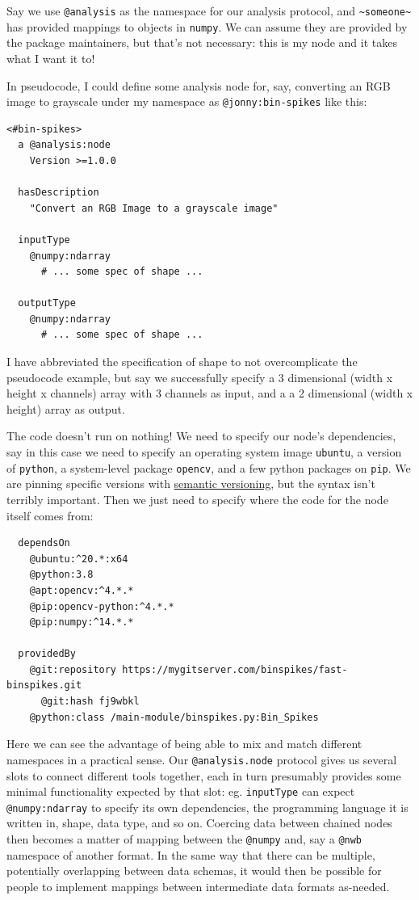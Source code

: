 \documentclass[10pt]{article}
\begin{document}
\begin{multicols}{2}
Say we use \texttt{@analysis} as the namespace for our analysis
protocol, and \texttt{\textasciitilde{}someone\textasciitilde{}} has
provided mappings to objects in \texttt{numpy}. We can assume they are
provided by the package maintainers, but that's not necessary: this is
my node and it takes what I want it to!

In pseudocode, I could define some analysis node for, say, converting an
RGB image to grayscale under my namespace as \texttt{@jonny:bin-spikes}
like this:

\begin{verbatim}
<#bin-spikes>
  a @analysis:node
    Version >=1.0.0

  hasDescription
    "Convert an RGB Image to a grayscale image"

  inputType
    @numpy:ndarray
      # ... some spec of shape ...

  outputType
    @numpy:ndarray
      # ... some spec of shape ...
\end{verbatim}

I have abbreviated the specification of shape to not overcomplicate the
pseudocode example, but say we successfully specify a 3 dimensional
(width x height x channels) array with 3 channels as input, and a a 2
dimensional (width x height) array as output.

The code doesn't run on nothing! We need to specify our node's
dependencies, say in this case we need to specify an operating system
image \texttt{ubuntu}, a version of \texttt{python}, a system-level
package \texttt{opencv}, and a few python packages on \texttt{pip}. We
are pinning specific versions with \href{https://semver.org/}{semantic
versioning}, but the syntax isn't terribly important. Then we just need
to specify where the code for the node itself comes from:

\begin{verbatim}
  dependsOn
    @ubuntu:^20.*:x64
    @python:3.8
    @apt:opencv:^4.*.*
    @pip:opencv-python:^4.*.*
    @pip:numpy:^14.*.*

  providedBy
    @git:repository https://mygitserver.com/binspikes/fast-binspikes.git
      @git:hash fj9wbkl
    @python:class /main-module/binspikes.py:Bin_Spikes
\end{verbatim}

Here we can see the advantage of being able to mix and match different
namespaces in a practical sense. Our \texttt{@analysis.node} protocol
gives us several slots to connect different tools together, each in turn
presumably provides some minimal functionality expected by that slot:
eg. \texttt{inputType} can expect \texttt{@numpy:ndarray} to specify its
own dependencies, the programming language it is written in, shape, data
type, and so on. Coercing data between chained nodes then becomes a
matter of mapping between the \texttt{@numpy} and, say a \texttt{@nwb}
namespace of another format. In the same way that there can be multiple,
potentially overlapping between data schemas, it would then be possible
for people to implement mappings between intermediate data formats
as-needed.


\end{multicols}
\end{document}
